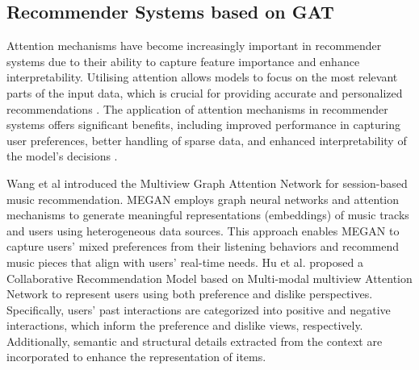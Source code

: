 \subsection{Recommender Systems based on GAT}

    Attention mechanisms have become increasingly important in recommender systems due to their ability to capture feature importance and enhance interpretability. Utilising attention allows models to focus on the most relevant parts of the input data, which is crucial for providing accurate and personalized recommendations \cite{wang2020disenhan}. The application of attention mechanisms in recommender systems offers significant benefits, including improved performance in capturing user preferences, better handling of sparse data, and enhanced interpretability of the model's decisions \cite{zhang2024hybrid}. 
    
    Wang et al \cite{wang2023multi} introduced the Multiview Graph Attention Network   for session-based music recommendation. MEGAN employs graph neural networks and attention mechanisms to generate meaningful representations (embeddings) of music tracks and users using heterogeneous data sources. This approach enables MEGAN to capture users' mixed preferences from their listening behaviors and recommend music pieces that align with users' real-time needs. Hu et al. \cite{hu2023collaborative} proposed a Collaborative Recommendation Model based on Multi-modal multiview Attention Network to represent users using both preference and dislike perspectives. Specifically, users' past interactions are categorized into positive and negative interactions, which inform the preference and dislike views, respectively. Additionally, semantic and structural details extracted from the context are incorporated to enhance the representation of items.
    
